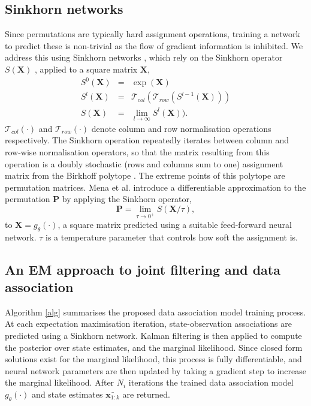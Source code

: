 \documentclass[journal]{IEEEtran}
\begin{document}
\subsection{Sinkhorn networks}
Since permutations are typically hard assignment operations, training a network to predict these is non-trivial as the flow of gradient information is inhibited. We address this using Sinkhorn networks \cite{mena2018learning}, which rely on the Sinkhorn operator $S(\mathbf{X})$ \cite{sinkhorn1964}, applied to a square matrix $\mathbf{X}$,  \begin{eqnarray}
S^0(\mathbf{X}) &=& \exp(\mathbf{X})\\
S^l(\mathbf{X}) &=& \mathcal{T}_{col}(\mathcal{T}_{row}(S^{l-1}(\mathbf{X})))\\
S(\mathbf{X}) &=& \lim_{l\to\infty}S^{l}(\mathbf{X})).
\end{eqnarray}
$\mathcal{T}_{col}(\cdot)$ and $\mathcal{T}_{row}(\cdot)$ denote column and row normalisation operations respectively. The Sinkhorn operation repeatedly iterates between column and row-wise normalisation operators, so that the matrix resulting from this operation is a doubly stochastic (rows and columns sum to one) assignment matrix from the Birkhoff polytope \cite{sinkhorn1964}. The extreme points of this polytope are permutation matrices. Mena et al. \cite{mena2018learning} introduce a differentiable approximation to the permutation $\mathbf{P}$ by applying the Sinkhorn operator, \begin{equation}
\mathbf{P} = \lim_{\tau\to0^+} S(\mathbf{X}/\tau),
\end{equation}
to $\mathbf{X} = g_\theta(\cdot)$, a square matrix predicted using a suitable feed-forward neural network. $\tau$ is a temperature parameter that controls how soft the assignment is.

\subsection{An EM approach to joint filtering and data association}

Algorithm \ref{alg} summarises the proposed data association model training process. At each expectation maximisation iteration, state-observation associations are predicted using a Sinkhorn network. Kalman filtering is then applied to compute the posterior over state estimates, and the marginal likelihood. Since closed form solutions exist for the marginal likelihood, this process is fully differentiable, and neural network parameters are then updated by taking a gradient step to increase the marginal likelihood. After $N_i$ iterations the trained data association model $g_\theta(\cdot)$ and state estimates $\bar{\mathbf{x}_{1:k}}$ are returned.
\end{document}
